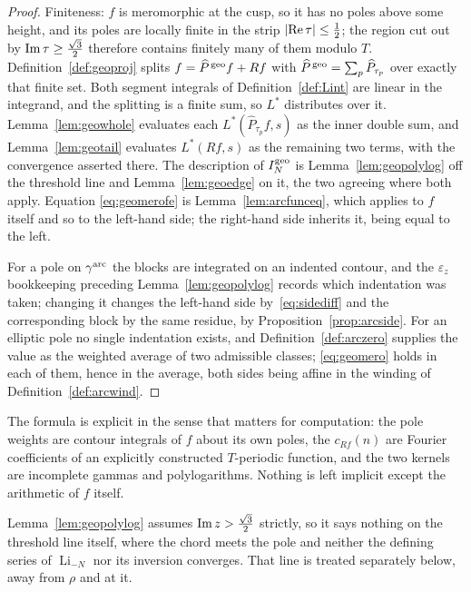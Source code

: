 \documentclass[11pt]{article}
\DeclareMathOperator{\Li}{Li}
\begin{document}
\begin{proof}
Finiteness: $f$ is meromorphic at the cusp, so it has no poles above some height, and its poles
are locally finite in the strip $|{\rm Re}\,\tau|\le\tfrac12$; the region cut out by
${\rm Im}\,\tau\ge\tfrac{\sqrt3}{2}$ therefore contains finitely many of them modulo $T$.
Definition~\ref{def:geoproj} splits $f=\widehat P^{\,\rm geo}f+Rf$ with
$\widehat P^{\,\rm geo}=\sum_p\widehat P_{\tau_p}$ over exactly that finite set. Both segment
integrals of Definition~\ref{def:Lint} are linear in the integrand, and the splitting is a finite
sum, so $L^*$ distributes over it. Lemma~\ref{lem:geowhole} evaluates each
$L^*(\widehat P_{\tau_p}f,s)$ as the inner double sum, and Lemma~\ref{lem:geotail} evaluates
$L^*(Rf,s)$ as the remaining two terms, with the convergence asserted there. The description of
$I^{\rm geo}_N$ is Lemma~\ref{lem:geopolylog} off the threshold line and
Lemma~\ref{lem:geoedge} on it, the two agreeing where both apply. Equation
\eqref{eq:geomerofe} is Lemma~\ref{lem:arcfunceq}, which applies to $f$ itself and so to the
left-hand side; the right-hand side inherits it, being equal to the left.

For a pole on $\gamma^{\rm arc}$ the blocks are integrated on an indented contour, and the
$\varepsilon_z$ bookkeeping preceding Lemma~\ref{lem:geopolylog} records which indentation was
taken; changing it changes the left-hand side by~\eqref{eq:sidediff} and the corresponding block
by the same residue, by Proposition~\ref{prop:arcside}. For an elliptic pole no single indentation
exists, and Definition~\ref{def:arczero} supplies the value as the weighted average of two
admissible classes; \eqref{eq:geomero} holds in each of them, hence in the average, both sides
being affine in the winding of Definition~\ref{def:arcwind}.
\end{proof}

The formula is explicit in the sense that matters for computation: the pole weights are contour
integrals of $f$ about its own poles, the $c_{Rf}(n)$ are Fourier coefficients of an explicitly
constructed $T$-periodic function, and the two kernels are incomplete gammas and polylogarithms.
Nothing is left implicit except the arithmetic of $f$ itself.


Lemma~\ref{lem:geopolylog} assumes ${\rm Im}\,z>\tfrac{\sqrt3}{2}$ strictly, so it says nothing on
the threshold line itself, where the chord meets the pole and neither the defining series of
$\Li_{-N}$ nor its inversion converges. That line is treated separately below, away from $\rho$
and at it.
\end{document}
